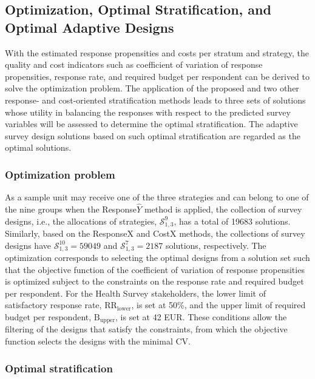 \documentclass[12pt]{article}
\begin{document}
\subsection{Optimization, Optimal Stratification, and Optimal Adaptive Designs}
\label{subsec:optimization-optimal-stratification-optimal-adaptive-designs}

With the estimated response propensities and costs per stratum and strategy, the quality and cost indicators such as coefficient of variation of response propensities, response rate, and required budget per respondent can be derived to solve the optimization problem.
The application of the proposed and two other response- and cost-oriented stratification methods leads to three sets of solutions whose utility in balancing the responses with respect to the predicted survey variables will be assessed to determine the optimal stratification.
The adaptive survey design solutions based on such optimal stratification are regarded as the optimal solutions.

\subsubsection{Optimization problem}
\label{subsubsec:optimization-problem}

As a sample unit may receive one of the three strategies and can belong to one of the nine groups when the Response$\hat{Y}$ method is applied, the collection of survey designs, i.e., the allocations of strategies, $\mathcal{S}^9_{1,3}$, has a total of 19683 solutions.
Similarly, based on the ResponseX and CostX methods, the collections of survey designs have $\mathcal{S}^{10}_{1,3}=\text{59049}$ and $\mathcal{S}^7_{1,3}=\text{2187}$ solutions, respectively.
The optimization corresponds to selecting the optimal designs from a solution set such that the objective function of the coefficient of variation of response propensities is optimized subject to the constraints on the response rate and required budget per respondent.
For the Health Survey stakeholders, the lower limit of satisfactory response rate, $\mathrm{RR}_{\mathrm{lower}}$, is set at 50\%, and the upper limit of required budget per respondent, $\mathrm{B}_{\mathrm{upper}}$, is set at 42 EUR.
These conditions allow the filtering of the designs that satisfy the constraints, from which the objective function selects the designs with the minimal $\mathrm{CV}$.


\subsubsection{Optimal stratification}
\end{document}

